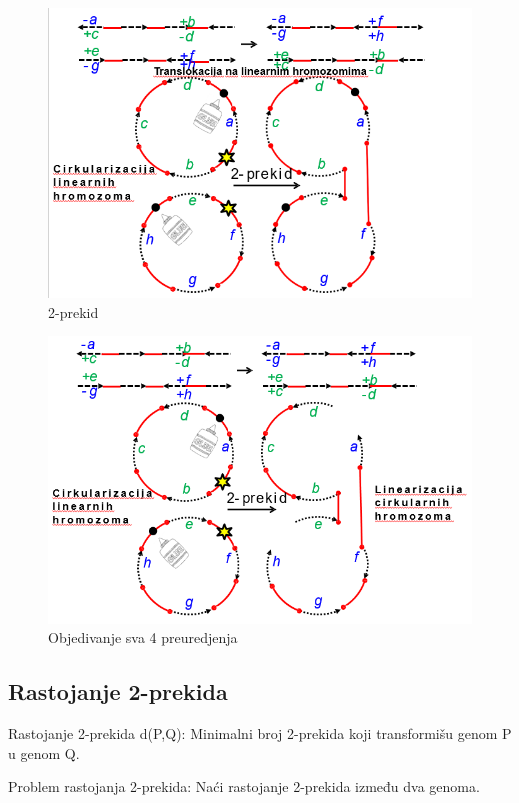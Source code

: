 \begin{figure}[h]
\centering
\includegraphics[scale=0.6]{poglavlja/6/slike/2_prekid_1.PNG}
\caption{2-prekid}
\label{slika:X}
\end{figure}

\newpage
\begin{figure}[h]
\centering
\includegraphics[scale=0.6]{poglavlja/6/slike/2_prekid_2.PNG}
\caption{Objedivanje sva 4 preuredjenja}
\label{slika:X}
\end{figure}

\subsection{Rastojanje 2-prekida}

\begin{definicija} {Rastojanje 2-prekida d(P,Q): Minimalni broj 2-prekida koji transformišu genom P u genom Q.}
\end{definicija}
\begin{definicija} {Problem rastojanja 2-prekida: Naći rastojanje 2-prekida između dva genoma.}
\end{definicija}

